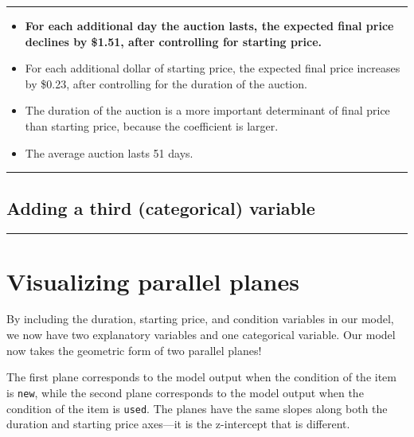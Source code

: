 \documentclass[
]{book}
\begin{document}
\begin{center}\rule{0.5\linewidth}{0.5pt}\end{center}

\begin{itemize}
\item
  \textbf{For each additional day the auction lasts, the expected final price declines by \$1.51, after controlling for starting price.}
\item
  For each additional dollar of starting price, the expected final price increases by \$0.23, after controlling for the duration of the auction.
\item
  The duration of the auction is a more important determinant of final price than starting price, because the coefficient is larger.
\item
  The average auction lasts 51 days.
\end{itemize}

\begin{center}\rule{0.5\linewidth}{0.5pt}\end{center}

\hypertarget{adding-a-third-categorical-variable}{%
\subsection*{Adding a third (categorical) variable}\label{adding-a-third-categorical-variable}}

\begin{center}\rule{0.5\linewidth}{0.5pt}\end{center}

\hypertarget{visualizing-parallel-planes}{%
\section{Visualizing parallel planes}\label{visualizing-parallel-planes}}

By including the duration, starting price, and condition variables in our model, we now have two explanatory variables and one categorical variable. Our model now takes the geometric form of two parallel planes!

The first plane corresponds to the model output when the condition of the item is \texttt{new}, while the second plane corresponds to the model output when the condition of the item is \texttt{used}. The planes have the same slopes along both the duration and starting price axes---it is the z-intercept that is different.
\end{document}
